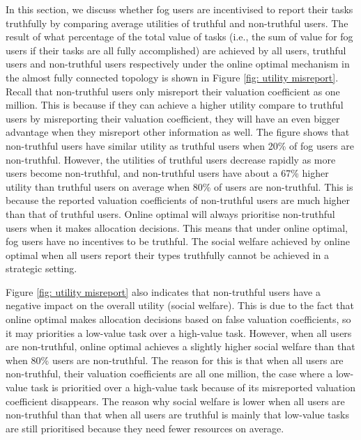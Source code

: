 \documentclass[11pt]{phdthesis}
\begin{document}
In this section, we discuss whether fog users are incentivised to report their tasks truthfully by comparing average utilities of truthful and non-truthful users. The result of what percentage of the total value of tasks (i.e., the sum of value for fog users if their tasks are all fully accomplished) are achieved by all users, truthful users and non-truthful users respectively under the online optimal mechanism in the almost fully connected topology is shown in Figure \ref{fig: utility misreport}. Recall that non-truthful users only misreport their valuation coefficient as one million. This is because if they can achieve a higher utility compare to truthful users by misreporting their valuation coefficient, they will have an even bigger advantage when they misreport other information as well. The figure shows that non-truthful users have similar utility as truthful users when 20\% of fog users are non-truthful. However, the utilities of truthful users decrease rapidly as more users become non-truthful, and non-truthful users have about a 67\% higher utility than truthful users on average when 80\% of users are non-truthful. This is because the reported valuation coefficients of non-truthful users are much higher than that of truthful users. Online optimal will always prioritise non-truthful users when it makes allocation decisions. This means that under online optimal, fog users have no incentives to be truthful. The social welfare achieved by online optimal when all users report their types truthfully cannot be achieved in a strategic setting.

Figure \ref{fig: utility misreport} also indicates that non-truthful users have a negative impact on the overall utility (social welfare). This is due to the fact that online optimal makes allocation decisions based on false valuation coefficients, so it may priorities a low-value task over a high-value task. However, when all users are non-truthful, online optimal achieves a slightly higher social welfare than that when 80\% users are non-truthful. The reason for this is that when all users are non-truthful, their valuation coefficients are all one million, the case where a low-value task is prioritied over a high-value task because of its misreported valuation coefficient disappears. The reason why social welfare is lower when all users are non-truthful than that when all users are truthful is mainly that low-value tasks are still prioritised because they need fewer resources on average.
\end{document}
